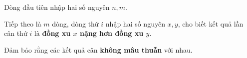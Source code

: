 Dòng đầu tiên nhập hai số nguyên $n, m$.

Tiếp theo là $m$ dòng, dòng thứ $i$ nhập hai số nguyên $x, y$, cho biết kết quả lần cân thứ $i$ là \textbf{đồng xu $x$ nặng hơn đồng xu $y$}.

Đảm bảo rằng các kết quả cân \textbf{không mâu thuẫn} với nhau.
